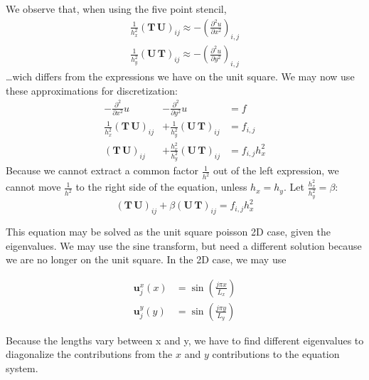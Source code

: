 We observe that, when using the five point stencil,
\begin{align}
  \frac{1}{h_x^2} (\mathbf{{T}} \, \mathbf{{U}})_{ij} \approx -\left( \frac{\partial^2 u}{\partial x^2} \right)_{i,j}
\end{align}
\begin{align}
  \frac{1}{h_y^2} (\mathbf{{U}} \, \mathbf{{T}})_{ij} \approx -\left( \frac{\partial^2 u}{\partial y^2} \right)_{i,j}
\end{align}
\ldots wich differs from the expressions we have on the unit square. We may now use these approximations for discretization:
\begin{equation}
\begin{array}{ccl}
	-\frac{\partial^2 }{\partial x^2} u &-\frac{\partial^2}{\partial y^2} u &= f \\
  \frac{1}{h_x^2}(\mathbf{{T}} \, \mathbf{{U}})_{ij} &+\frac{1}{h_y^2} (\mathbf{{U}} \, \mathbf{{T}})_{ij} &= f_{i,j} \\
	(\mathbf{{T}} \, \mathbf{{U}})_{ij} &+\frac{h_x^2}{h_y^2} (\mathbf{{U}} \, \mathbf{{T}})_{ij} &= f_{i,j} h_x^2
\end{array}
\end{equation}
Because we cannot extract a common factor $\frac{1}{h^2}$ out of the left expression, we cannot move $\frac{1}{h^2}$ to the right side of the equation, unless $h_x = h_y$. Let $\frac{h_x^2}{h_y^2} = \beta$:
\begin{equation}
(\mathbf{{T}} \, \mathbf{{U}})_{ij} +\beta (\mathbf{{U}} \, \mathbf{{T}})_{ij} = f_{i,j} h_x^2
\end{equation}

This equation may be solved as the unit square poisson 2D case, given the eigenvalues. We may use the sine transform, but need a different solution because we are no longer on the unit square. In the 2D case, we may use

\begin{align}
  \mathbf{u}_j^x(x) &= \sin(\frac{j \pi x}{L_x}) \\
  \mathbf{u}_j^y(y) &= \sin(\frac{j \pi y}{L_y})
\end{align}

Because the lengths vary between x and y, we have to find different eigenvalues to diagonalize the contributions from the $x$ and $y$ contributions to the equation system.
